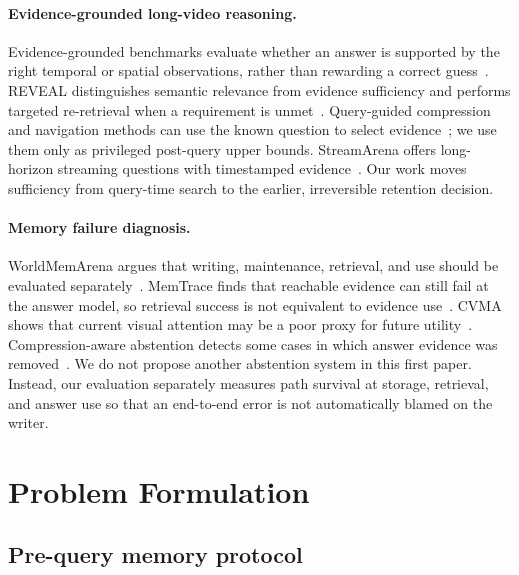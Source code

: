\documentclass[10pt,twocolumn,letterpaper]{article}
\begin{document}
\paragraph{Evidence-grounded long-video reasoning.}
Evidence-grounded benchmarks evaluate whether an answer is supported by the right temporal or spatial observations, rather than rewarding a correct guess~\cite{wang2026evidencebackedvideoquestionanswering,huang2026egvqabenchmarkingverifiablevideo,meng2026videozerobenchprobinglimitsvideo}.
REVEAL distinguishes semantic relevance from evidence sufficiency and performs targeted re-retrieval when a requirement is unmet~\cite{yan2026revealrubricguidedagentexplicit}.
Query-guided compression and navigation methods can use the known question to select evidence~\cite{yamao2026questionguidedvisualcompressionmemory,qiu2026longvideor1smartnavigationlowcost}; we use them only as privileged post-query upper bounds.
StreamArena offers long-horizon streaming questions with timestamped evidence~\cite{zhang2026streamarenacontinuousinteractivelonghorizon}.
Our work moves sufficiency from query-time search to the earlier, irreversible retention decision.

\paragraph{Memory failure diagnosis.}
WorldMemArena argues that writing, maintenance, retrieval, and use should be evaluated separately~\cite{liu2026worldmemarenaevaluatingmultimodalagent}.
MemTrace finds that reachable evidence can still fail at the answer model, so retrieval success is not equivalent to evidence use~\cite{long2026memtraceprobingfinalaccuracy}.
CVMA shows that current visual attention may be a poor proxy for future utility~\cite{chen2026seensaidforgottencausal}.
Compression-aware abstention detects some cases in which answer evidence was removed~\cite{khodabandehlou2026compressionawareabstentionteachingllms}.
We do not propose another abstention system in this first paper.
Instead, our evaluation separately measures path survival at storage, retrieval, and answer use so that an end-to-end error is not automatically blamed on the writer.

\section{Problem Formulation}
\label{sec:problem}

\subsection{Pre-query memory protocol}
\end{document}
